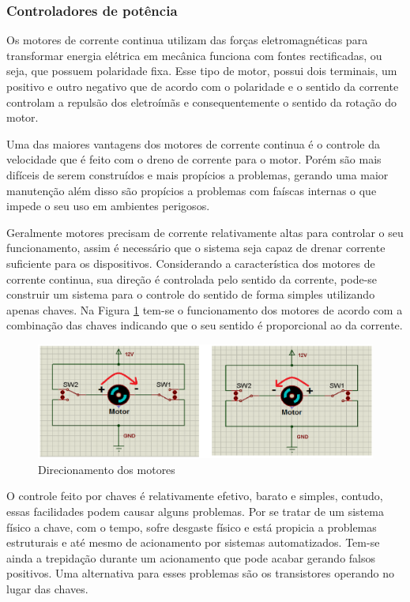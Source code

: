 \subsubsection{Controladores de potência}

Os motores de corrente continua utilizam das forças eletromagnéticas para transformar energia elétrica em mecânica funciona com fontes rectificadas, ou seja, que possuem polaridade fixa. Esse tipo de motor, possui dois terminais, um positivo e outro negativo que de acordo com o polaridade e o sentido da corrente controlam a repulsão dos eletroímãs e consequentemente o sentido da rotação do motor.

Uma das maiores vantagens dos motores de corrente continua é o controle da velocidade que é feito com o dreno de corrente para o motor. Porém são mais difíceis de serem construídos e mais propícios a problemas, gerando uma maior manutenção além disso são propícios a problemas com faíscas internas o que impede o seu uso em ambientes perigosos.

Geralmente motores precisam de corrente relativamente altas para controlar o seu funcionamento, assim é necessário que o sistema seja capaz de drenar corrente suficiente para os dispositivos. Considerando a característica dos motores de corrente continua, sua direção é controlada pelo sentido da corrente, pode-se construir um sistema para o controle do sentido de forma simples utilizando apenas chaves. Na Figura \ref{fig:direcionamento_motores} tem-se o funcionamento dos motores de acordo com a combinação das chaves indicando que o seu sentido é proporcional ao da corrente.

\begin{figure}[!htb]
\centering
  \includegraphics[keepaspectratio=true,scale=0.6]{figuras/controle/direcionamento_motores}
\caption{Direcionamento dos motores}
\label{fig:direcionamento_motores}
\end{figure}

O controle feito por chaves é relativamente efetivo, barato e simples, contudo, essas facilidades podem causar alguns problemas. Por se tratar de um sistema físico a chave, com o tempo, sofre desgaste físico e está propicia a problemas estruturais e até mesmo de acionamento por sistemas automatizados. Tem-se ainda a trepidação durante um acionamento que pode acabar gerando falsos positivos. Uma alternativa para esses problemas são os transistores operando no lugar das chaves.

